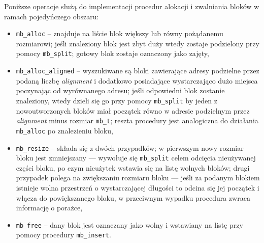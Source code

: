 \documentclass[12pt,a4paper,titlepage,twoside]{mwart}
\begin{document}
Poniższe operacje służą do implementacji procedur alokacji i zwalniania bloków
w ramach pojedyńczego obszaru:
\begin{itemize}
\item \verb+mb_alloc+ -- znajduje na liście blok większy lub równy pożądanemu
rozmiarowi; jeśli znaleziony blok jest zbyt duży wtedy zostaje podzielony przy
pomocy \verb+mb_split+; gotowy blok zostaje oznaczony jako zajęty,
\item \verb+mb_alloc_aligned+ -- wyszukiwane są bloki zawierające adresy
podzielne przez podaną liczbę \textit{alignment} i dodatkowo posiadające
wystarczająco dużo miejsca poczynając od wyrównanego adresu; jeśli odpowiedni
blok zostanie znaleziony, wtedy dzieli się go przy pomocy \verb+mb_split+ by
jeden z nowoutworzonych bloków miał początek równo w adresie podzielnym przez
\textit{alignment} minus rozmiar \verb+mb_t+; reszta procedury jest analogiczna
do działania \verb+mb_alloc+ po znalezieniu bloku,
\item \verb+mb_resize+ -- składa się z dwóch przypadków; w pierwszym nowy
rozmiar bloku jest zmniejszany --- wywołuje się \verb+mb_split+ celem odcięcia
nieużywanej części bloku, po czym nieużytek wstawia się na listę wolnych
bloków; drugi przypadek polega na zwiększaniu rozmiaru bloku --- jeśli za
podanym blokiem istnieje wolna przestrzeń o wystarczającej długości to odcina
się jej początek i włącza do powiększanego bloku, w przeciwnym wypadku
procedura zwraca informację o porażce,
\item \verb+mb_free+ -- dany blok jest oznaczany jako wolny i wstawiany na
listę przy pomocy procedury \verb+mb_insert+.
\end{itemize}
\end{document}
